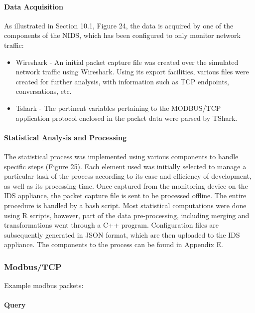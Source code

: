 \documentclass[11pt,]{article}
\begin{document}
\paragraph{Data Acquisition}\label{data-acquisition}

As illustrated in Section 10.1, Figure 24, the data is acquired by one
of the components of the NIDS, which has been configured to only monitor
network traffic:

\begin{itemize}
\itemsep1pt\parskip0pt
\item
  Wireshark - An initial packet capture file was created over the
  simulated network traffic using Wireshark. Using its export
  facilities, various files were created for further analysis, with
  information such as TCP endpoints, conversations, etc.
\item
  Tshark - The pertinent variables pertaining to the MODBUS/TCP
  application protocol enclosed in the packet data were parsed by
  TShark.
\end{itemize}

\paragraph{Statistical Analysis and
Processing}\label{statistical-analysis-and-processing}

The statistical process was implemented using various components to
handle specific steps (Figure 25). Each element used was initially
selected to manage a particular task of the process according to its
ease and efficiency of development, as well as its processing time. Once
captured from the monitoring device on the IDS appliance, the packet
capture file is sent to be processed offline. The entire procedure is
handled by a bash script. Most statistical computations were done using
R scripts, however, part of the data pre-processing, including merging
and transformations went through a C++ program. Configuration files are
subsequently generated in JSON format, which are then uploaded to the
IDS appliance. The components to the process can be found in Appendix E.

\clearpage

\subsubsection{Modbus/TCP}\label{modbustcp-1}

Example modbus packets:

\paragraph{Query}\label{query}
\end{document}
